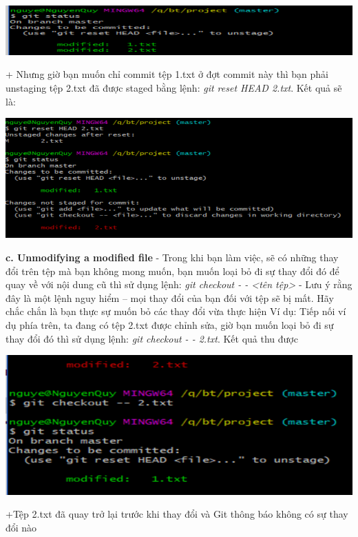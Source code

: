 \documentclass[12pt,a4paper]{report}
\begin{document}
	\includegraphics[width=0.8\linewidth]{screenshot029}

	\label{fig:screenshot029}
\vskip 0.4cm\vskip 0.4cm
+ Nhưng giờ bạn muốn chỉ commit tệp 1.txt ở đợt commit này thì bạn phải unstaging tệp 2.txt đã được staged bằng lệnh: {\it git reset HEAD 2.txt}. Kết quả sẽ là:\vskip 0.4cm

	\includegraphics[width=0.8\linewidth]{screenshot030}

	\label{fig:screenshot030}
\vskip 0.4cm\vskip 0.4cm
{\bf c. Unmodifying a modified file}\vskip 0.4cm
- Trong khi bạn làm việc, sẽ có những thay đổi trên tệp mà bạn không mong muốn, bạn muốn loại bỏ đi sự thay đổi đó để quay về với nội dung cũ thì sử dụng lệnh: {\it git checkout - - <tên tệp>}\vskip 0.4cm
- Lưu ý rằng đây là một lệnh nguy hiểm – mọi thay đổi của bạn đối với tệp sẽ bị mất. Hãy chắc chắn là bạn thực sự muốn bỏ các thay đổi vừa thực hiện\vskip 0.4cm
Ví dụ: Tiếp nối ví dụ phía trên, ta đang có tệp 2.txt được chỉnh sửa, giờ bạn muốn loại bỏ đi sự thay đổi đó thì sử dụng lệnh: {\it git checkout - - 2.txt}. Kết quả thu được\vskip 0.4cm

	\includegraphics[width=0.8\linewidth]{screenshot031}

	\label{fig:screenshot031}
\vskip 0.4cm\vskip 0.4cm
+Tệp 2.txt đã quay trở lại trước khi thay đổi và Git thông báo không có sự thay đổi nào\vskip 0.4cm




\newpage
\end{document}

